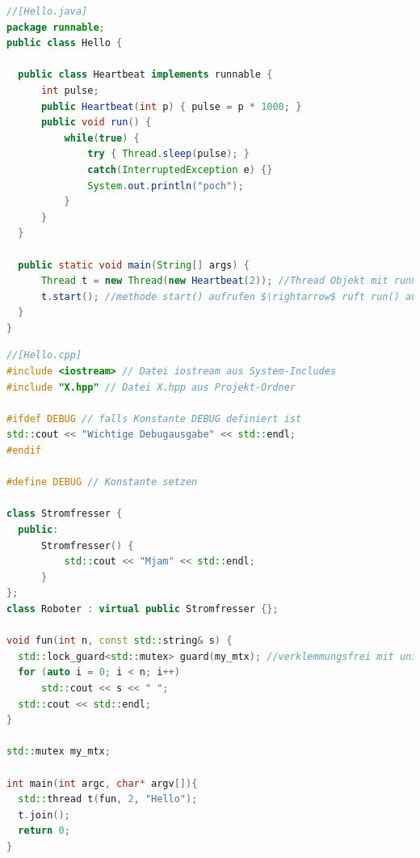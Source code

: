 \documentclass[10pt]{article}
\begin{document}
\begin{lstlisting}[language=java]
//[Hello.java]
package runnable;
public class Hello {

  public class Heartbeat implements runnable {
      int pulse;
      public Heartbeat(int p) { pulse = p * 1000; }
      public void run() {
          while(true) {
              try { Thread.sleep(pulse); }
              catch(InterruptedException e) {}
              System.out.println("poch");
          }
      }
  }

  public static void main(String[] args) {
      Thread t = new Thread(new Heartbeat(2)); //Thread Objekt mit runnable erzeugen
      t.start(); //methode start() aufrufen $\rightarrow$ ruft run() auf
  }
}
\end{lstlisting}
\hfill
\begin{lstlisting}[language=C++]
//[Hello.cpp]
#include <iostream> // Datei iostream aus System-Includes
#include "X.hpp" // Datei X.hpp aus Projekt-Ordner

#ifdef DEBUG // falls Konstante DEBUG definiert ist
std::cout << "Wichtige Debugausgabe" << std::endl;
#endif

#define DEBUG // Konstante setzen

class Stromfresser {
  public:
      Stromfresser() {
          std::cout << "Mjam" << std::endl;
      }
};
class Roboter : virtual public Stromfresser {};

void fun(int n, const std::string& s) {
  std::lock_guard<std::mutex> guard(my_mtx); //verklemmungsfrei mit unique_lock<std::mutex>
  for (auto i = 0; i < n; i++)
      std::cout << s << " ";
  std::cout << std::endl;
}

std::mutex my_mtx;

int main(int argc, char* argv[]){
  std::thread t(fun, 2, "Hello");
  t.join();
  return 0;
}
\end{lstlisting}
\hfill
\end{document}

